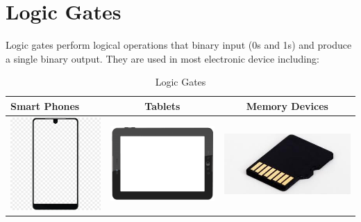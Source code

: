 \documentclass{article}
\begin{document}
\section{Logic Gates}
Logic gates perform logical operations that binary input (0s and 1s) and produce a single binary output. They are used in most electronic device including:

\begin{table}[h!]
	\centering
		\caption{Logic Gates}
		\label{tab:table1}
		\begin{tabular}{|l|c|c|}
			\hline
			Smart Phones & Tablets & Memory Devices
			\\
			\hline
			\includegraphics[width=0.16\linewidth]{phone.png}
			& \includegraphics[width=0.2\linewidth]{download.png}
			& \includegraphics[width=0.25\linewidth]{download.jpg}\\
			\hline
		\end{tabular}
\end{table}
\end{document}
